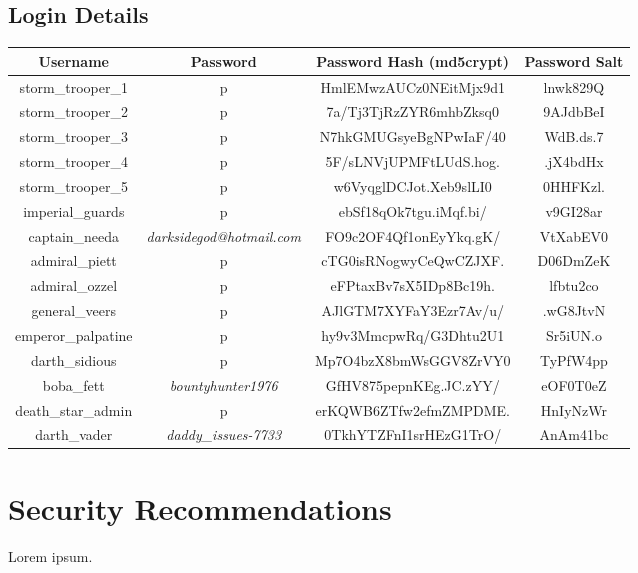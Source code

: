 \documentclass{article}
\begin{document}
\subsection{Login Details}

\begin{adjustwidth}{-1.5cm}{}
\begin{tabular}{ |c|c|c|c| }
\hline
\textbf{Username} & \textbf{Password} & \textbf{Password Hash (md5crypt)} & \textbf{Password Salt} \\
\hline
storm\_trooper\_1 & p & HmlEMwzAUCz0NEitMjx9d1 & lnwk829Q \\
\hline
storm\_trooper\_2 & p & 7a/Tj3TjRzZYR6mhbZksq0 & 9AJdbBeI \\
\hline
storm\_trooper\_3 & p & N7hkGMUGsyeBgNPwIaF/40 & WdB.ds.7 \\
\hline
storm\_trooper\_4 & p & 5F/sLNVjUPMFtLUdS.hog. & .jX4bdHx \\
\hline
storm\_trooper\_5 & p & w6VyqglDCJot.Xeb9slLI0 & 0HHFKzl. \\
\hline
imperial\_guards & p & ebSf18qOk7tgu.iMqf.bi/ & v9GI28ar \\
\hline
captain\_needa & \emph{darksidegod@hotmail.com} & FO9c2OF4Qf1onEyYkq.gK/ & VtXabEV0 \\
\hline
admiral\_piett & p & cTG0isRNogwyCeQwCZJXF. & D06DmZeK \\
\hline
admiral\_ozzel & p & eFPtaxBv7sX5IDp8Bc19h. & lfbtu2co \\
\hline
general\_veers & p & AJlGTM7XYFaY3Ezr7Av/u/ & .wG8JtvN \\
\hline
emperor\_palpatine & p & hy9v3MmcpwRq/G3Dhtu2U1 & Sr5iUN.o \\
\hline
darth\_sidious & p & Mp7O4bzX8bmWsGGV8ZrVY0 & TyPfW4pp \\
\hline
boba\_fett & \emph{bountyhunter1976} & GfHV875pepnKEg.JC.zYY/ & eOF0T0eZ \\
\hline
death\_star\_admin & p & erKQWB6ZTfw2efmZMPDME. & HnIyNzWr \\
\hline
darth\_vader & \emph{daddy\_issues-7733} & 0TkhYTZFnI1srHEzG1TrO/ & AnAm41bc \\
\hline
\end{tabular}
\end{adjustwidth}

\newpage

\section{Security Recommendations}
\paragraph{}
Lorem ipsum.
\end{document}
